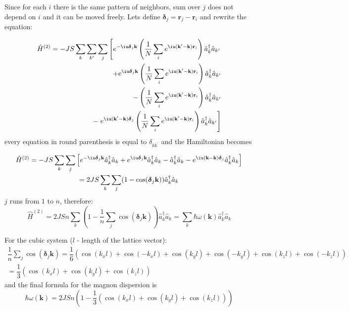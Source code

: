 Since for each $i$ there is the same pattern of neighbors, sum over $j$ does not depend on $i$ and it can be moved freely.
Lets define $\boldsymbol{\delta}_j = \mathbf{r}_j - \mathbf{r}_i$ and rewrite the equation:

\begin{equation}
\begin{aligned}
    \hat{H}^{(2)}  = -JS \sum_k\sum_{k^{\prime}}\sum_j \left[
        e^{-\iu\boldsymbol{\delta}_j\mathbf{k}}
        \left(\dfrac{1}{N}\sum_ie^{\iu(\mathbf{k^{\prime}}-\mathbf{k})\mathbf{r}_i}\right) 
        \hat{a}_k^{\dag}\hat{a}_{k^{\prime}}\right. \\
        +
        e^{\iu\boldsymbol{\delta}_j\mathbf{k}}
        \left(\dfrac{1}{N}\sum_ie^{\iu(\mathbf{k^{\prime}}-\mathbf{k})\mathbf{r}_i}\right)
         \hat{a}_k^{\dag}\hat{a}_{k^{\prime}}  \\
        -
        \left(\dfrac{1}{N}\sum_ie^{\iu(\mathbf{k^{\prime}}-\mathbf{k})\mathbf{r}_i}\right)
        \hat{a}_k^{\dag}\hat{a}_{k^{\prime}}  \\
        -
        \left.e^{\iu(\mathbf{k^{\prime}}-\mathbf{k})\boldsymbol{\delta}_j}
        \left(\dfrac{1}{N}\sum_ie^{\iu(\mathbf{k^{\prime}}-\mathbf{k})\mathbf{r}_i}\right)
        \hat{a}_k^{\dag}\hat{a}_{k^{\prime}} \right]
\end{aligned}
\end{equation}
every equation in round parenthesis is equal to $\delta_{kk^{\prime}}$ and the Hamiltonian becomes

\begin{multline}
    \hat{H}^{(2)} = -JS\sum_k\sum_j\left[e^{-\iu\boldsymbol{\delta}_j\mathbf{k}}
    \hat{a}_k^{\dag}\hat{a}_k
    +
    e^{\iu\boldsymbol{\delta}_j\mathbf{k}}
     \hat{a}_k^{\dag}\hat{a}_k 
    -
    \hat{a}_k^{\dag}\hat{a}_k 
    -
    e^{\iu(\mathbf{k}-\mathbf{k})\boldsymbol{\delta}_j}
    \hat{a}_k^{\dag}\hat{a}_k\right] \\
     = 2JS\sum_k\sum_j(1 - \cos(\boldsymbol{\delta}_j\mathbf{k}))\hat{a}_k^{\dag}\hat{a}_k
\end{multline}
$j$ runs from $1$ to $n$, therefore:
\begin{equation}
    \hat{H}^{(2)} = 2JSn\sum_k\left(1 - \dfrac{1}{n}\sum_j
    \cos(\boldsymbol{\delta}_j\mathbf{k})\right)\hat{a}_k^{\dag}\hat{a}_k = 
    \sum_k \hbar\omega(\mathbf{k})\hat{a}_k^{\dag}\hat{a}_k
\end{equation}

For the cubic system ($l$ - length of the lattice vector):
\begin{align}
    \dfrac{1}{n}\sum_j
    \cos(\boldsymbol{\delta}_j\mathbf{k})  = \dfrac{1}{6}\left(\cos(k_xl) + \cos(-k_xl) + \cos(k_yl) + \cos(-k_yl) + \cos(k_zl) + \cos(-k_zl)\right) \\
    = \dfrac{1}{3}\left(\cos(k_x l) + \cos(k_y l) + \cos(k_z l)\right)
\end{align}
and the final formula for the magnon dispersion is
\begin{equation}
    \hbar\omega(\mathbf{k}) = 2JSn\left(1 - 
    \dfrac{1}{3}\left(\cos(k_x l) + \cos(k_y l) + \cos(k_z l)\right)\right)
\end{equation}